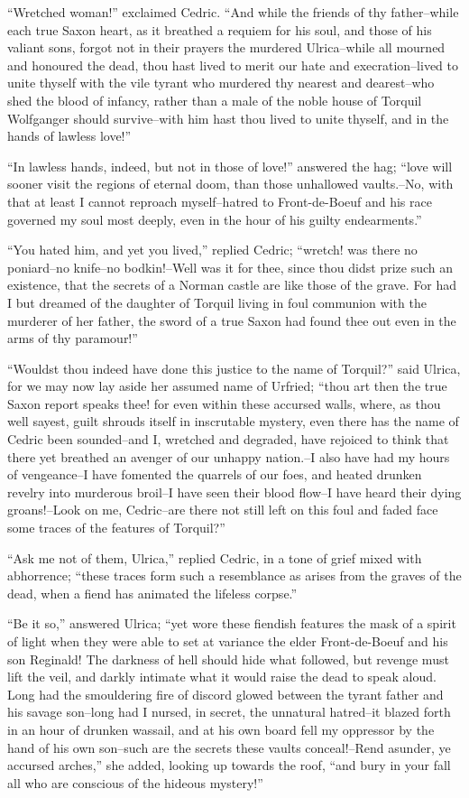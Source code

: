 ``Wretched woman!'' exclaimed Cedric. ``And while the friends of thy
father--while each true Saxon heart, as it breathed a requiem for his
soul, and those of his valiant sons, forgot not in their prayers the
murdered Ulrica--while all mourned and honoured the dead, thou hast
lived to merit our hate and execration--lived to unite thyself with the
vile tyrant who murdered thy nearest and dearest--who shed the blood of
infancy, rather than a male of the noble house of Torquil Wolfganger
should survive--with him hast thou lived to unite thyself, and in the
hands of lawless love!''

``In lawless hands, indeed, but not in those of love!'' answered the
hag; ``love will sooner visit the regions of eternal doom, than those
unhallowed vaults.--No, with that at least I cannot reproach
myself--hatred to Front-de-Boeuf and his race governed my soul most
deeply, even in the hour of his guilty endearments.''

``You hated him, and yet you lived,'' replied Cedric; ``wretch! was
there no poniard--no knife--no bodkin!--Well was it for thee, since thou
didst prize such an existence, that the secrets of a Norman castle are
like those of the grave. For had I but dreamed of the daughter of
Torquil living in foul communion with the murderer of her father, the
sword of a true Saxon had found thee out even in the arms of thy
paramour!''

``Wouldst thou indeed have done this justice to the name of Torquil?''
said Ulrica, for we may now lay aside her assumed name of Urfried;
``thou art then the true Saxon report speaks thee! for even within these
accursed walls, where, as thou well sayest, guilt shrouds itself in
inscrutable mystery, even there has the name of Cedric been sounded--and
I, wretched and degraded, have rejoiced to think that there yet breathed
an avenger of our unhappy nation.--I also have had my hours of
vengeance--I have fomented the quarrels of our foes, and heated drunken
revelry into murderous broil--I have seen their blood flow--I have heard
their dying groans!--Look on me, Cedric--are there not still left on
this foul and faded face some traces of the features of Torquil?''

``Ask me not of them, Ulrica,'' replied Cedric, in a tone of grief mixed
with abhorrence; ``these traces form such a resemblance as arises from
the graves of the dead, when a fiend has animated the lifeless corpse.''

``Be it so,'' answered Ulrica; ``yet wore these fiendish features the
mask of a spirit of light when they were able to set at variance the
elder Front-de-Boeuf and his son Reginald! The darkness of hell should
hide what followed, but revenge must lift the veil, and darkly intimate
what it would raise the dead to speak aloud. Long had the smouldering
fire of discord glowed between the tyrant father and his savage
son--long had I nursed, in secret, the unnatural hatred--it blazed forth
in an hour of drunken wassail, and at his own board fell my oppressor by
the hand of his own son--such are the secrets these vaults
conceal!--Rend asunder, ye accursed arches,'' she added, looking up
towards the roof, ``and bury in your fall all who are conscious of the
hideous mystery!''

